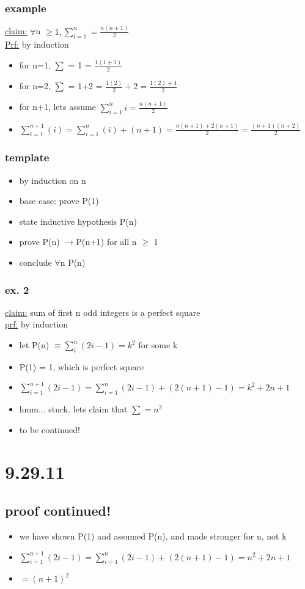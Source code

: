 \documentclass[a4paper]{article}
\newcommand{\ra}{$\rightarrow$}
\newcommand{\fa}{$\forall$}
\newcommand{\bi}{\begin{itemize}}
\newcommand{\ei}{\end{itemize}}
\begin{document}
\begin{itemize}
      \subsubsection{example}
        \underline{claim:} \fa n $\geq 1, \sum_{i=1}^n = \frac{n(n+1)}{2}$\\
        \underline{Prf:} by induction
          \bi
            \item for n=1, $\sum$ = 1 = $\frac{1(1+1)}{2}$
            \item for n=2, $\sum$ = 1+2 = $\frac{1(2)}{2} + 2 = \frac{1(2) + 4}{2}$
            \item for n+1, lets assume $\sum_{i=1}^n i = \frac{n(n+1)}{2}$
            \item $\sum_{i=1}^{n+1}(i) = \sum_{i=1}^n(i) + (n+1) = \frac{n(n+1) + 2(n+1)}{2} = \frac{(n+1)(n+2)}{2}$
          \ei
      \subsubsection{template}
        \bi
          \item by induction on n
          \item base case: prove P(1)
          \item state inductive hypothesis P(n)
          \item prove P(n) \ra P(n+1) for all n $\geq$ 1
          \item conclude \fa n P(n)
        \ei
      \subsubsection{ex. 2}
        \underline{claim:} sum of first n odd integers is a perfect square\\
        \underline{prf:} by induction
        \bi
          \item let P(n) $\equiv \sum_i^n (2i-1) = k^2$ for some k
          \item P(1) = 1, which is perfect square
          \item $\sum_{i=1}^{n+1} (2i-1) = \sum_{i=1}^n (2i-1) + (2(n+1)-1) = k^2 + 2n + 1$
          \item hmm... stuck. lets claim that $\sum = n^2$
          \item to be continued!
        \ei
  \section{9.29.11}          
    \subsection{proof continued!}
      \bi
        \item we have shown P(1) and assumed P(n), and made stronger for n, not
        k
        \item $\sum_{i=1}^{n+1} (2i-1) = \sum_{i=1}^n (2i-1) + (2(n+1)-1) = n^2 + 2n + 1$
        \item $ = (n+1)^2$
      \ei

\end{itemize}
\end{document}
